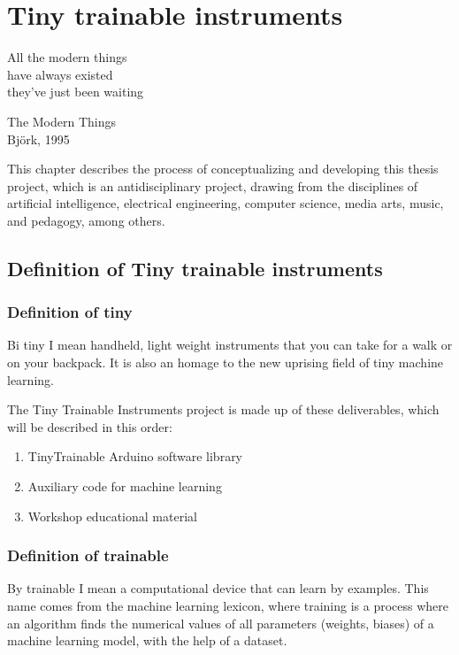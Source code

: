 \chapter{Tiny trainable instruments}

\epigraph{All the modern things \\ have always existed \\ they've just been waiting}{The Modern Things \\ Björk, 1995}

This chapter describes the process of conceptualizing and developing this thesis project, which is an antidisciplinary project, drawing from the disciplines of artificial intelligence, electrical engineering, computer science, media arts, music, and pedagogy, among others.

\section{Definition of Tiny trainable instruments}

\subsection{Definition of tiny}

Bi tiny I mean handheld, light weight instruments that you can take for a walk or on your backpack. It is also an homage to the new uprising field of tiny machine learning.

The Tiny Trainable Instruments project is made up of these deliverables, which will be described in this order:

\begin{enumerate}
  \item TinyTrainable Arduino software library
  \item Auxiliary code for machine learning
  \item Workshop educational material
\end{enumerate}


\subsection{Definition of trainable}

By trainable I mean a computational device that can learn by examples. This name comes from the machine learning lexicon, where training is a process where an algorithm finds the numerical values of all parameters (weights, biases) of a machine learning model, with the help of a dataset.

